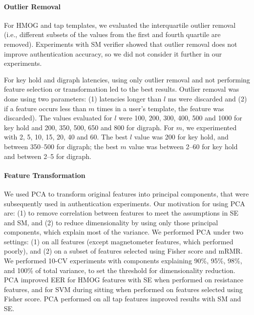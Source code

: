 \paragraph{Outlier Removal}
For HMOG and tap templates, we evaluated the interquartile outlier removal (i.e., different subsets of the values from the first and fourth quartile are removed). Experiments with SM verifier showed that outlier removal does not improve authentication accuracy, so we did not consider it further in our experiments. 


For key hold and digraph latencies, using only outlier removal and not performing feature selection or transformation led to the best results. Outlier removal was done using two parameters: (1) latencies longer than $l$ ms were discarded and (2) if a feature occurs less than $m$ times in a user's template, the feature was discarded). 
The values evaluated for $l$ were 100, 200, 300, 400, 500 and 1000 for key hold and 200, 350, 500, 650 and 800 for digraph.
 For $m$, we experimented with 2, 5, 10, 15, 20, 40 and 60. 
%
The best $l$ value was 200 for key hold, and between 350--500 for digraph; the best $m$ value was between 2--60 for key hold and between 2--5 for digraph.

\paragraph{Feature Transformation} 
We used PCA to transform original features into principal components, that were subsequently used in authentication experiments. Our motivation for using PCA are: (1) to remove correlation between features to meet the assumptions in SE and SM, and (2) to reduce dimensionality by using only those principal components, which explain most of the variance. We performed PCA under two settings: (1) on all features (except magnetometer features, which performed poorly), and  (2) on a subset of features selected using Fisher score and mRMR. We performed 10-CV experiments with components explaining 90\%, 95\%, 98\%, and 100\% of total variance, to set the threshold for dimensionality reduction. PCA improved EER for HMOG features with SE when performed on resistance features, and for SVM during sitting when performed on features selected using Fisher score. %
PCA performed on all tap features improved results with SM and SE. %

%
%
%

%

%

%
%

%

%
%
%
%




%
%



